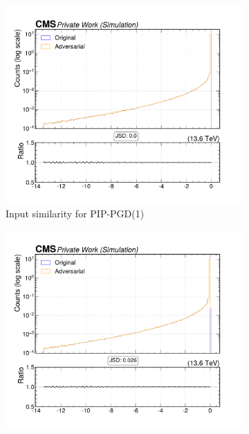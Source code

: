 \begin{figure}[htbp]
  \centering
  \begin{subfigure}[t]{0.32\textwidth}
    \includegraphics[width=\linewidth]{media/output/features/compare/combined_it_1/cmp_cpf_arr_Cpfcan_BtagPf_trackJetDistVal.pdf}
    \caption*{Input similarity for PIP-PGD(1)}
  \end{subfigure}\hfill
  \begin{subfigure}[t]{0.32\textwidth}
    \includegraphics[width=\linewidth]{media/output/features/compare/combined_it_2/cmp_cpf_arr_Cpfcan_BtagPf_trackJetDistVal.pdf}

\end{subfigure}
\end{figure}
